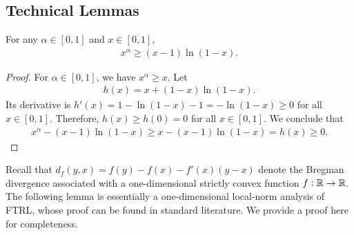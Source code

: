 \subsection{Technical Lemmas}
\label{sec:CoordinateWiseSPMTechnicalLemmas}
\begin{lemma}
    For any $\alpha \in [0,1]$ and $x \in [0,1]$, 
    \begin{align}
        x^{\alpha} \geq (x-1)\ln(1-x).
    \end{align}
    \label{lemma:xalphadominatesxminus1lnxminus1}
\end{lemma}
\begin{proof}
    For $\alpha \in [0,1]$, we have $x^\alpha \geq x$. Let
    \begin{align}
        h(x) = x + (1-x)\ln(1-x).
    \end{align}
    Its derivative is $h'(x) = 1 - \ln(1-x) - 1 = -\ln(1-x) \geq 0$ for all $x \in [0,1]$. Therefore, $h(x) \geq h(0) = 0$ for all $x \in [0,1]$. We conclude that
    \begin{align}
        x^{\alpha} - (x-1)\ln(1-x) \geq x - (x-1)\ln(1-x) = h(x) \geq 0.
    \end{align}
\end{proof}
Recall that $d_f(y, x) = f(y) - f(x) - f'(x)(y-x)$ denote the Bregman divergence associated with a one-dimensional strictly convex function $f: \mathbb{R} \to \mathbb{R}$. The following lemma is essentially a one-dimensional local-norm analysis of FTRL, whose proof can be found in standard literature. We provide a proof here for completeness.

